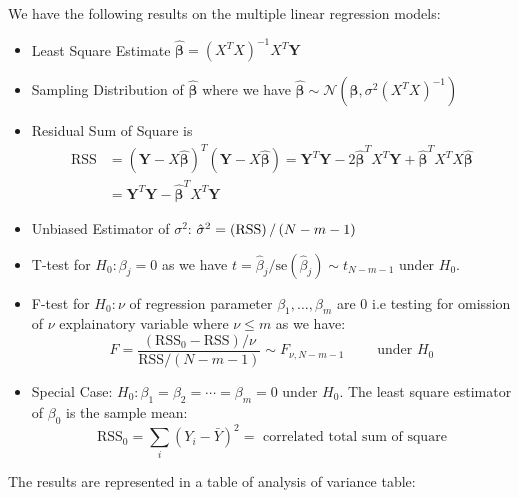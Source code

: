 \begin{remark}
    We have the following results on the multiple linear regression models:
    \begin{itemize}
        \item Least Square Estimate $\hat{\boldsymbol \beta} = (X^TX)^{-1}X^T\boldsymbol Y$
        \item Sampling Distribution of $\hat{\boldsymbol \beta}$ where we have $\hat{\boldsymbol \beta} \sim \mathcal{N}(\boldsymbol \beta, \sigma^2(X^TX)^{-1})$
        \item Residual Sum of Square is 
        \begin{equation*}
        \begin{aligned}
            \text{RSS} &= (\boldsymbol Y - X\hat{\boldsymbol \beta})^T(\boldsymbol Y - X\hat{\boldsymbol \beta}) = \boldsymbol Y^T\boldsymbol Y - 2\hat{\boldsymbol \beta}^TX^T\boldsymbol Y + \hat{\boldsymbol \beta}^TX^TX\hat{\boldsymbol \beta} \\
            &= \boldsymbol Y^T\boldsymbol Y - \hat{\boldsymbol \beta}^TX^T\boldsymbol Y
        \end{aligned}
        \end{equation*}
        \item Unbiased Estimator of $\sigma^2$: $\hat{\sigma}^2 = \left( \text{RSS} \right)/\left( N-m-1 \right)$
        \item T-test for $H_0: \beta_j=0$ as we have $t = \hat{\beta}_j/\text{se}(\hat{\beta}_j) \sim t_{N-m-1}$ under $H_0$.
        \item F-test for $H_0: \nu$ of regression parameter $\beta_1,\dots,\beta_m$ are $0$ i.e testing for omission of $\nu$ explainatory variable where $\nu\le m$ as we have:
        \begin{equation*}
            F = \frac{(\text{RSS}_0 - \text{RSS})/\nu}{\text{RSS}/(N-m-1)} \sim F_{\nu, N-m-1} \qquad \text{ under } H_0
        \end{equation*}
        \item Special Case: $H_0: \beta_1=\beta_2=\cdots=\beta_m = 0$ under $H_0$. The least square estimator of $\beta_0$ is the sample mean:
        \begin{equation*}
            \text{RSS}_0 = \sum_i (Y_i - \bar{Y})^2 = \text{ correlated total sum of square}
        \end{equation*}
    \end{itemize}
    The results are represented in a table of analysis of variance table:
    \begin{table}[H]

\end{table}
\end{remark}
